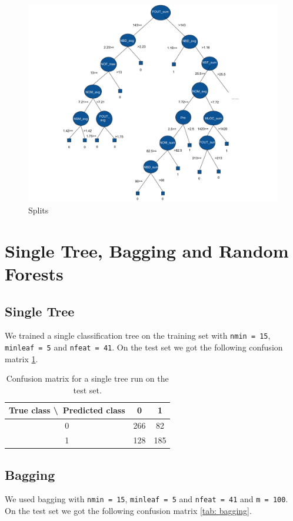 \documentclass[a4paper,11pt]{article}
\begin{document}
\begin{figure}[h!]
\includegraphics[width=\textwidth]{Tree2.pdf}
\caption{Splits} %
\label{fig: tree2}
\end{figure}

\section{Single Tree, Bagging and Random Forests}

\subsection{Single Tree}
We trained a single classification tree on the training set with \verb|nmin = 15|, \verb|minleaf = 5| and \verb|nfeat = 41|. On the test set we got the following confusion matrix \ref{tab: singletree}.
 
\begin{table}[h!]
\centering
	\begin{tabular}{c||c|c}
	True class \textbackslash\ Predicted class & 0 & 1 \\ \hline \hline
	0 & 266 & 82 \\ \hline
	1 & 128 & 185
	\end{tabular}
	\caption{Confusion matrix for a single tree run on the test set.}
	\label{tab: singletree}
\end{table}


\subsection{Bagging}
We used bagging with \verb|nmin = 15|, \verb|minleaf = 5| and \verb|nfeat = 41| and \verb|m = 100|. On the test set we got the following confusion matrix \ref{tab: bagging}.
\end{document}
